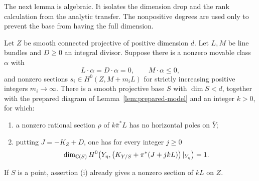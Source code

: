 The next lemma is algebraic. It isolates the dimension drop and the
rank calculation from the analytic transfer. The nonpositive degrees
are used only to prevent the base from having the full dimension.

\begin{lemma}\label{lem:maximal-base}
Let $Z$ be smooth connected projective of positive dimension $d$.
Let $L,M$ be line bundles and $D\ge0$ an integral divisor. Suppose
there is a nonzero movable class $\alpha$ with
\[
 L\cdot\alpha=D\cdot\alpha=0,\qquad M\cdot\alpha\le0,
\]
and nonzero sections $s_i\in H^0(Z,M+m_iL)$ for strictly increasing
positive integers $m_i\to\infty$.
There is a smooth projective base $S$ with $\dim S<d$, together with
the prepared diagram of Lemma~\ref{lem:prepared-model} and an integer
$k>0$, for which:
\begin{enumerate}[label=\textup{(\roman*)}]
\item a nonzero rational section $\rho$ of $k\bar\pi^*L$ has no
      horizontal poles on $\bar Y$;
\item putting $J=-K_Z+D$, one has for every integer $j\ge0$
\begin{equation}\label{eq:induction-ranks}
 \dim_{\mathbb C(S)}H^0\!\left(Y_\eta,
   \left(K_{Y/S}+\pi^*(J+jkL)\right)|_{Y_\eta}\right)=1.
\end{equation}
\end{enumerate}
If $S$ is a point, assertion \textup{(i)} already gives a nonzero
section of $kL$ on $Z$.
\end{lemma}

